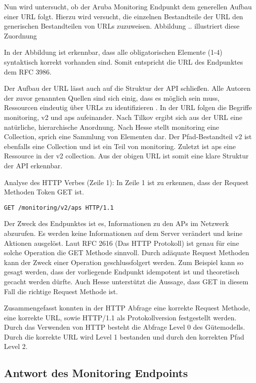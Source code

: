 Nun wird untersucht, ob der Aruba Monitoring Endpunkt dem generellen Aufbau einer URL folgt. Hierzu wird versucht, die einzelnen Bestandteile der URL den generischen Bestandteilen von URLs zuzuweisen. Abbildung .. illustriert diese Zuordnung

In der Abbildung ist erkennbar, dass alle obligatorischen Elemente (1-4) syntaktisch korrekt vorhanden sind. Somit entspricht die URL des Endpunktes dem RFC 3986.

Der Aufbau der URL lässt auch auf die Struktur der API schließen. Alle Autoren der zuvor genannten Quellen sind sich einig, dass es möglich sein muss, Ressourcen eindeutig über URLs zu identifizieren . In der URL folgen die Begriffe monitoring, v2 und aps aufeinander. Nach Tilkov ergibt sich aus der URL eine natürliche, hierarchische Anordnung. Nach Hesse stellt monitoring eine Collection, sprich eine Sammlung von Elementen dar. Der Pfad-Bestandteil v2 ist ebenfalls eine Collection und ist ein Teil von monitoring. Zuletzt ist aps eine Ressource in der v2 collection. Aus der obigen URL ist somit eine klare Struktur der API erkennbar. 

Analyse des HTTP Verbes (Zeile 1): In Zeile 1 ist zu erkennen, dass der Request Methoden Token GET ist. 

\begin{lstlisting}
GET /monitoring/v2/aps HTTP/1.1
\end{lstlisting}

Der Zweck des Endpunktes ist es, Informationen zu den APs im Netzwerk abzurufen. Es werden keine Informationen auf dem Server verändert und keine Aktionen ausgelöst. Laut RFC 2616 (Das HTTP Protokoll) ist genau für eine solche Operation die GET Methode sinnvoll. Durch adäquate Request Methoden kann der Zweck einer Operation geschlussfolgert werden. Zum Beispiel kann so gesagt werden, dass der vorliegende Endpunkt idempotent ist und theoretisch gecacht werden dürfte. Auch Hesse unterstützt die Aussage, dass GET in diesem Fall die richtige Request Methode ist.

Zusammengefasst konnten in der HTTP Abfrage eine korrekte Request Methode, eine korrekte URL, sowie HTTP/1.1 als Protokollversion festgestellt werden. Durch das Verwenden von HTTP besteht die Abfrage Level 0 des Gütemodells. Durch die korrekte URL wird Level 1 bestanden und durch den korrekten Pfad Level 2.

\subsection{Antwort des Monitoring Endpoints}

